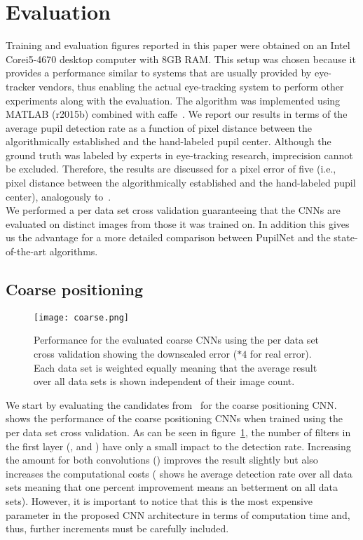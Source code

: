 \section{Evaluation}
\label{sec:eval}
\label{sec:expeval}
Training and evaluation figures reported in this paper were obtained on an
Intel\textsuperscript{\textregistered} Core\texttrademark i5-4670 desktop
computer with 8GB RAM. This setup was chosen because it provides a
performance similar to systems that are usually provided by eye-tracker vendors,
thus enabling the actual eye-tracking system to perform other experiments along with the evaluation.
The algorithm was implemented using MATLAB (r2015b) combined with caffe~\citet{jia2014caffe}.
We report our results in terms of the average pupil detection rate as a function
of pixel distance between the algorithmically established and the hand-labeled
pupil center.
Although the ground truth was labeled by experts in eye-tracking research,
imprecision cannot be excluded. Therefore, the results are discussed for a pixel
error of five (i.e., pixel distance between the algorithmically established and
the hand-labeled pupil center), analogously to~\citet{fuhl2015excuse,swirski2012robust}.\\
We performed a per data set cross validation guaranteeing that the CNNs are evaluated on distinct images from those it was trained on. In addition this gives us the advantage for a more detailed comparison between PupilNet and the state-of-the-art algorithms.

\subsection{Coarse positioning}
\begin{figure}[h]
	\begin{center}
		\texttt{[image: coarse.png]}
	\end{center}
	\caption{
		Performance for the evaluated coarse CNNs using the per data set cross validation showing the downscaled error ($*4$ for real error). Each data set is weighted equally meaning that the average result over all data sets is shown independent of their image count.
	}
	\label{fig:evalcoarse}
\end{figure}
We start by evaluating the candidates from~ for the coarse
positioning CNN.  shows the performance of the coarse positioning CNNs
when trained using the per data set cross validation.
As can be seen in figure~\ref{fig:evalcoarse}, the number of filters in the first layer
(, and ) have only a small impact to the detection rate.
Increasing the amount for both convolutions () improves the result slightly but also increases the computational costs ( shows he average detection rate over all data sets meaning that one percent improvement means an betterment on all data sets). However, it is important to notice
that this is the most expensive parameter in the proposed CNN architecture in
terms of computation time and, thus, further increments must be carefully included.

